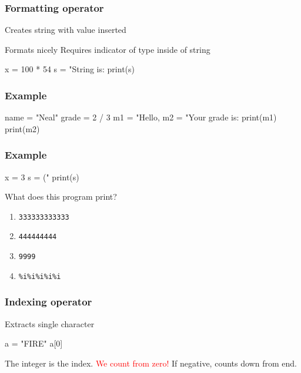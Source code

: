 \documentclass[11pt]{beamer}
\begin{document}
\begin{frame}[fragile]
  \frametitle{Formatting operator}
  \Enlarge

  \begin{itemize}
  \myitem  Creates string with value inserted
    \begin{itemize}
    \mysubitem  Formats nicely
    \mysubitem  Requires indicator of type inside of string
    \end{itemize}
  \begin{semiverbatim}
x = 100 * 54
s = "String is: %
print(s)
  \end{semiverbatim}
  \end{itemize}
\end{frame}

\begin{frame}[fragile]
  \frametitle{Example}
  \Enlarge

  \begin{semiverbatim}
name = "Neal"
grade = 2 / 3
m1 = "Hello, %
m2 = "Your grade is:  %
print(m1)
print(m2)
  \end{semiverbatim}
\end{frame}

\begin{frame}[fragile]
  \frametitle{Example}
  \Enlarge

  \begin{semiverbatim}
x = 3
s = ("%
print(s)
  \end{semiverbatim}

  What does this program print?
  \begin{enumerate}[label=\Alph*]
  \item  \texttt{333333333333}
  \item  \texttt{444444444}
  \item  \texttt{9999}
  \item  \texttt{\%i\%i\%i\%i\%i}
  \end{enumerate}
\end{frame}

\begin{frame}[fragile]
  \frametitle{Indexing operator}
  \Enlarge

  \begin{itemize}
  \myitem  Extracts single character
\begin{semiverbatim}
a = "FIRE"
a[0]
\end{semiverbatim}
  \myitem  The integer is the index.
  \myitem  \textcolor{red}{We count from zero!}
  \myitem  If negative, counts down from end.
  \end{itemize}
\end{frame}
\end{document}
